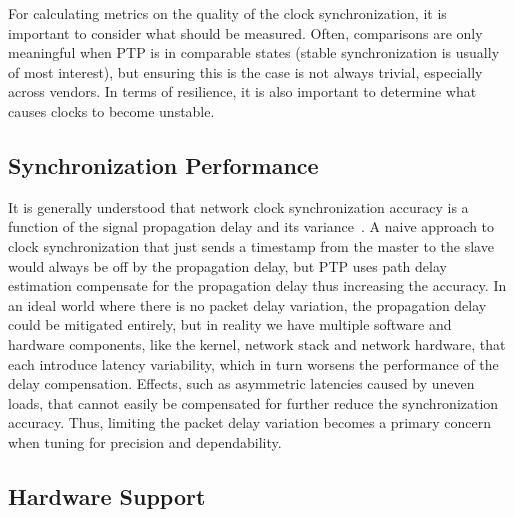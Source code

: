 For calculating metrics on the quality of the clock synchronization, it is important to consider what should be measured. Often, comparisons are only meaningful when PTP is in comparable states (stable synchronization is usually of most interest), but ensuring this is the case is not always trivial, especially across vendors.
In terms of resilience, it is also important to determine what causes clocks to become unstable.


\subsection{Synchronization Performance}
It is generally understood that network clock synchronization accuracy is a function of the signal propagation delay and its variance~\cite{managin-pdv-for-ptp}. A naive approach to clock synchronization that just sends a timestamp from the master to the slave would always be off by the propagation delay, but PTP uses path delay estimation compensate for the propagation delay thus increasing the accuracy. In an ideal world where there is no packet delay variation, the propagation delay could be mitigated entirely, but in reality we have multiple software and hardware components, like the kernel, network stack and network hardware, that each introduce latency variability, which in turn worsens the performance of the delay compensation. Effects, such as asymmetric latencies caused by uneven loads, that cannot easily be compensated for further reduce the synchronization accuracy. Thus, limiting the packet delay variation becomes a primary concern when tuning for precision and dependability.

\subsection{Hardware Support}

